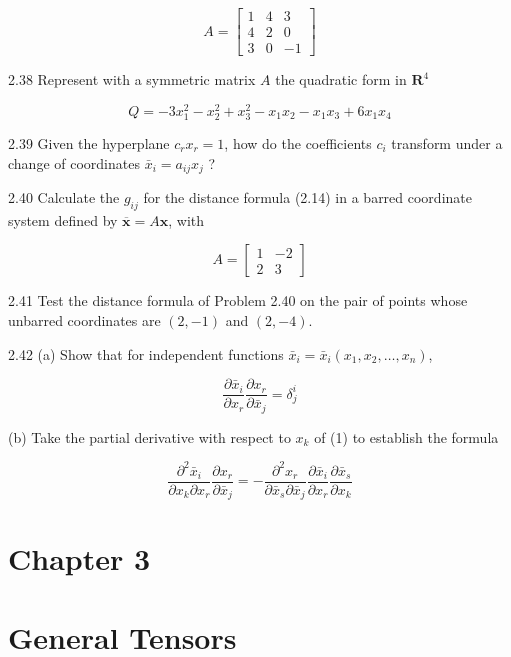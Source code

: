 \documentclass[10pt]{article}
\begin{document}
$$
A=\left[\begin{array}{rrr}
1 & 4 & 3 \\
4 & 2 & 0 \\
3 & 0 & -1
\end{array}\right]
$$

2.38 Represent with a symmetric matrix $A$ the quadratic form in $\mathbf{R}^{4}$

$$
Q=-3 x_{1}^{2}-x_{2}^{2}+x_{3}^{2}-x_{1} x_{2}-x_{1} x_{3}+6 x_{1} x_{4}
$$

2.39 Given the hyperplane $c_{r} x_{r}=1$, how do the coefficients $c_{i}$ transform under a change of coordinates $\bar{x}_{i}=a_{i j} x_{j}$ ?

2.40 Calculate the $g_{i j}$ for the distance formula (2.14) in a barred coordinate system defined by $\overline{\mathbf{x}}=A \mathbf{x}$, with

$$
A=\left[\begin{array}{rr}
1 & -2 \\
2 & 3
\end{array}\right]
$$

2.41 Test the distance formula of Problem 2.40 on the pair of points whose unbarred coordinates are $(2,-1)$ and $(2,-4)$.

2.42 (a) Show that for independent functions $\bar{x}_{i}=\bar{x}_{i}\left(x_{1}, x_{2}, \ldots, x_{n}\right)$,


\begin{equation*}
\frac{\partial \bar{x}_{i}}{\partial x_{r}} \frac{\partial x_{r}}{\partial \bar{x}_{j}}=\delta_{j}^{i} \tag{1}
\end{equation*}


(b) Take the partial derivative with respect to $x_{k}$ of (1) to establish the formula


\begin{equation*}
\frac{\partial^{2} \bar{x}_{i}}{\partial x_{k} \partial x_{r}} \frac{\partial x_{r}}{\partial \bar{x}_{j}}=-\frac{\partial^{2} x_{r}}{\partial \bar{x}_{s} \partial \bar{x}_{j}} \frac{\partial \bar{x}_{i}}{\partial x_{r}} \frac{\partial \bar{x}_{s}}{\partial x_{k}} \tag{2}
\end{equation*}


\section*{Chapter 3}
\section*{General Tensors}
\end{document}
